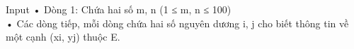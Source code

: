 Input
• Dòng 1: Chứa hai số m, n (1 ≤ m, n ≤ 100)   
\\   • Các dòng tiếp, mỗi dòng chứa hai số nguyên dương i, j cho biết thông tin về một cạnh (xi, yj) thuộc E.